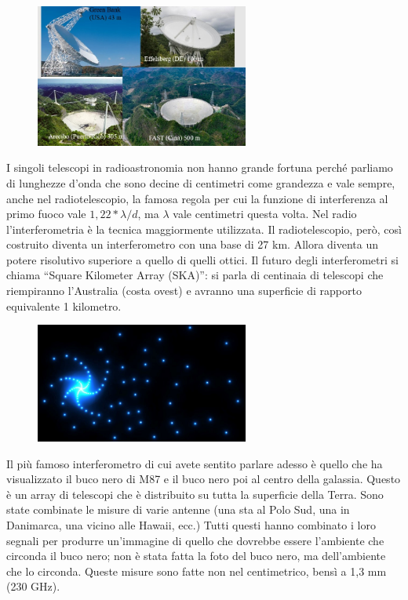 \documentclass[a4paper,11pt]{article}
\begin{document}
\begin{figure}[h!!]
        \centering
        \includegraphics[width=7cm]{32.jpg}
        \label{}
    \end{figure}

I singoli telescopi in radioastronomia non hanno grande fortuna perché parliamo di lunghezze d’onda che sono decine di centimetri come grandezza e vale sempre, anche nel radiotelescopio, la famosa regola per cui la funzione di interferenza al primo fuoco vale $1,22*{\lambda}/d$, ma ${\lambda}$ vale centimetri questa volta. Nel radio l’interferometria è la tecnica maggiormente utilizzata.
Il radiotelescopio, però, così costruito diventa un interferometro con una base di 27 km. Allora diventa un potere risolutivo superiore a quello di quelli ottici. Il futuro degli interferometri si chiama “Square Kilometer Array (SKA)”: si parla di centinaia di telescopi che riempiranno l’Australia (costa ovest) e avranno una superficie di rapporto equivalente 1 kilometro. 

\begin{figure}[h!!]
        \centering
        \includegraphics[width=7cm]{33.jpg}
        \label{}
    \end{figure}

Il più famoso interferometro di cui avete sentito parlare adesso è quello che ha visualizzato il buco nero di M87 e il buco nero poi al centro della galassia. Questo è un array di telescopi che è distribuito su tutta la superficie della Terra. Sono state combinate le misure di varie antenne (una sta al Polo Sud, una in Danimarca, una vicino alle Hawaii, ecc.) Tutti questi hanno combinato i loro segnali per produrre un’immagine di quello che dovrebbe essere l’ambiente che circonda il buco nero; non è stata fatta la foto del buco nero, ma dell’ambiente che lo circonda. Queste misure sono fatte non nel centimetrico, bensì a 1,3 mm (230 GHz).
\end{document}
